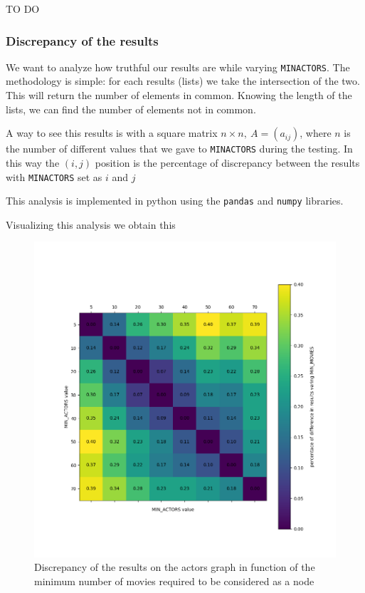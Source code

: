 TO DO

\subsubsection{Discrepancy of the results}
We want to analyze how truthful our results are while varying \texttt{MIN\textunderscore ACTORS}. The methodology is simple: for each results (lists) we take the intersection of the two. This will return the number of elements in common. Knowing the length of the lists, we can find the number of elements not in common. \s

\nd A way to see this results is with a square matrix $n \times n, ~ A = (a_{ij})$, where $n$ is the number of different values that we gave to \texttt{MIN\textunderscore ACTORS} during the testing. In this way the $(i,j)$ position is the percentage of discrepancy between the results with \texttt{MIN\textunderscore ACTORS} set as $i$ and $j$ \s

\nd This analysis is implemented in python using the \texttt{pandas} and \texttt{numpy} libraries.



\nd Visualizing this analysis we obtain this

\begin{figure}[h] \label{matrix-a}
    \includegraphics[width=12cm]{Figure_1.png}
    \caption{Discrepancy of the results on the actors graph in function of the minimum number of movies required to be considered as a node}
\end{figure}

